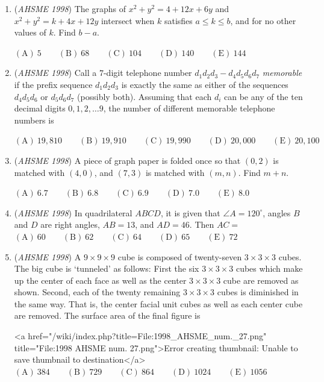 \begin{enumerate}
	\item (\textit{AHSME 1998}) The graphs of $x^2 + y^2 = 4 + 12x + 6y$ and $x^2 + y^2 = k + 4x + 12y$ intersect when $k$ satisfies $a \le k \le b$, and for no other values of $k$. Find $b-a$.


 $\mathrm{(A) \ }5 \qquad \mathrm{(B) \ }68 \qquad \mathrm{(C) \ }104 \qquad \mathrm{(D) \ }140 \qquad \mathrm{(E) \ }144$


	\item (\textit{AHSME 1998}) Call a $7$-digit telephone number $d_1d_2d_3-d_4d_5d_6d_7$ \textit{memorable} if the prefix sequence $d_1d_2d_3$ is exactly the same as either of the sequences $d_4d_5d_6$ or $d_5d_6d_7$ (possibly both). Assuming that each $d_i$ can be any of the ten decimal digits $0,1,2, \ldots 9$, the number of different memorable telephone numbers is 


 $\mathrm{(A) \ } 19,810 \qquad \mathrm{(B) \ } 19,910 \qquad \mathrm{(C) \ } 19,990 \qquad \mathrm{(D) \ } 20,000 \qquad \mathrm{(E) \ } 20,100$


	\item (\textit{AHSME 1998}) A piece of graph paper is folded once so that $(0,2)$ is matched with $(4,0)$, and $(7,3)$ is matched with $(m,n)$. Find $m+n$.


 $\mathrm{(A) \ }6.7 \qquad \mathrm{(B) \ }6.8 \qquad \mathrm{(C) \ }6.9 \qquad \mathrm{(D) \ }7.0 \qquad \mathrm{(E) \ }8.0$


	\item (\textit{AHSME 1998}) In quadrilateral $ABCD$, it is given that $\angle A = 120^{\circ}$, angles $B$ and $D$ are right angles, $AB = 13$, and $AD = 46$. Then $AC=$
$\mathrm{(A) \ } 60 \qquad \mathrm{(B) \ }62 \qquad \mathrm{(C) \ }64 \qquad \mathrm{(D) \ }65 \qquad \mathrm{(E) \ } 72$


	\item (\textit{AHSME 1998}) A $9 \times 9 \times 9$ cube is composed of twenty-seven $3 \times 3 \times 3$ cubes. The big cube is ‘tunneled’ as follows: First the six $3 \times 3 \times 3$ cubes which make up the center of each face as well as the center $3 \times 3 \times 3$ cube are removed as shown. Second, each of the twenty remaining $3 \times 3 \times 3$ cubes is diminished in the same way. That is, the center facial unit cubes as well as each center cube are removed. The surface area of the final figure is 


 <a href="/wiki/index.php?title=File:1998\_AHSME\_num.\_27.png" title="File:1998 AHSME num. 27.png">Error creating thumbnail: Unable to save thumbnail to destination</a>$\mathrm{(A) \ } 384 \qquad \mathrm{(B) \ } 729 \qquad \mathrm{(C) \ } 864 \qquad \mathrm{(D) \ } 1024 \qquad \mathrm{(E) \ } 1056$



\end{enumerate}
